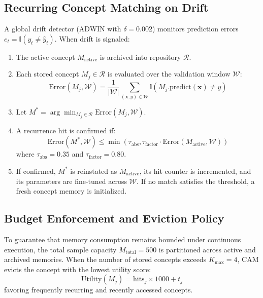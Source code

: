 \documentclass[conference]{IEEEtran}
\begin{document}
\subsection{Recurring Concept Matching on Drift}
A global drift detector (ADWIN with $\delta = 0.002$) monitors prediction errors $e_t = \mathbb{I}(y_t \ne \hat{y}_t)$. When drift is signaled:
\begin{enumerate}
    \item The active concept $M_{\text{active}}$ is archived into repository $\mathcal{R}$.
    \item Each stored concept $M_j \in \mathcal{R}$ is evaluated over the validation window $\mathcal{W}$:
    \begin{equation}
    \text{Error}(M_j, \mathcal{W}) = \frac{1}{|\mathcal{W}|} \sum_{(\mathbf{x}, y) \in \mathcal{W}} \mathbb{I}(M_j.\text{predict}(\mathbf{x}) \ne y)
    \end{equation}
    \item Let $M^* = \arg\min_{M_j \in \mathcal{R}} \text{Error}(M_j, \mathcal{W})$.
    \item A recurrence hit is confirmed if:
    \begin{equation}
    \text{Error}(M^*, \mathcal{W}) \le \min\left(\tau_{\text{abs}}, \tau_{\text{factor}} \cdot \text{Error}(M_{\text{active}}, \mathcal{W})\right)
    \end{equation}
    where $\tau_{\text{abs}} = 0.35$ and $\tau_{\text{factor}} = 0.80$.
    \item If confirmed, $M^*$ is reinstated as $M_{\text{active}}$, its hit counter is incremented, and its parameters are fine-tuned across $\mathcal{W}$. If no match satisfies the threshold, a fresh concept memory is initialized.
\end{enumerate}

\subsection{Budget Enforcement and Eviction Policy}
To guarantee that memory consumption remains bounded under continuous execution, the total sample capacity $M_{\text{total}} = 500$ is partitioned across active and archived memories. When the number of stored concepts exceeds $K_{\max} = 4$, CAM evicts the concept with the lowest utility score:
\begin{equation}
\text{Utility}(M_j) = \text{hits}_j \times 1000 + t_j
\end{equation}
favoring frequently recurring and recently accessed concepts.
\end{document}
